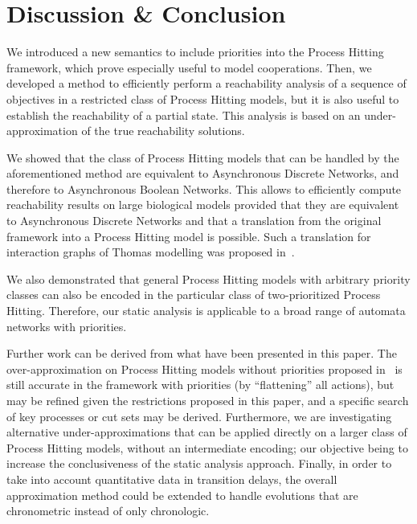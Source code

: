 \section{Discussion \& Conclusion}\label{sec:ccl}

We introduced a new semantics to include priorities into the Process Hitting framework, which prove especially useful to model cooperations.
Then, we developed a method to efficiently perform a reachability analysis of a sequence of objectives in a restricted class of Process Hitting models,
but it is also useful to establish the reachability of a partial state.
This analysis is based on an under-approximation of the true reachability solutions.

We showed that the class of Process Hitting models that can be handled by the aforementioned method are equivalent to Asynchronous Discrete Networks, and therefore to Asynchronous Boolean Networks.
This allows to efficiently compute reachability results on large biological models provided that they are equivalent to Asynchronous Discrete Networks and that a translation from the original framework into a Process Hitting model is possible.
Such a translation for interaction graphs of Thomas modelling was proposed in~\cite{PMR10-TCSB}. %

We also demonstrated that general Process Hitting models with arbitrary priority
classes can also be encoded in the particular class of two-prioritized Process Hitting.
Therefore, our static analysis is applicable to a broad range of automata
networks with priorities.

Further work can be derived from what have been presented in this paper.
The over-approximation on Process Hitting models without priorities proposed in~\cite{PMR12-MSCS}
is still accurate in the framework with priorities (by “flattening” all actions),
but may be refined given the restrictions proposed in this paper,
and a specific search of key processes or cut sets may be derived.
Furthermore, we are investigating alternative under-approximations that can be
applied directly on a larger class of Process Hitting models, \ie{} without an
intermediate encoding; our objective being to increase the conclusiveness of the static
analysis approach.
Finally, in order to take into account quantitative data in transition delays, the overall approximation method could be extended to handle evolutions that are chronometric instead of only chronologic.
